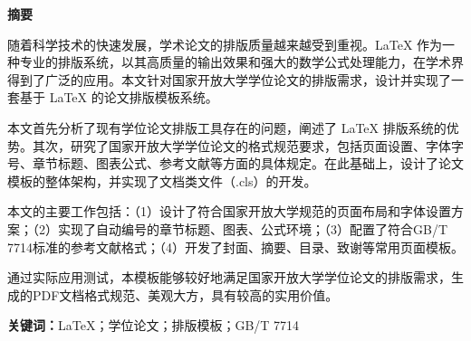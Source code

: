 
\begin{center}
    {\xiaosan{}\bfseries 摘\quad 要}
\end{center}

\vspace{0.5cm}

随着科学技术的快速发展，学术论文的排版质量越来越受到重视。LaTeX 作为一种专业的排版系统，以其高质量的输出效果和强大的数学公式处理能力，在学术界得到了广泛的应用。本文针对国家开放大学学位论文的排版需求，设计并实现了一套基于 LaTeX 的论文排版模板系统。

本文首先分析了现有学位论文排版工具存在的问题，阐述了 LaTeX 排版系统的优势。其次，研究了国家开放大学学位论文的格式规范要求，包括页面设置、字体字号、章节标题、图表公式、参考文献等方面的具体规定。在此基础上，设计了论文模板的整体架构，并实现了文档类文件（.cls）的开发。

本文的主要工作包括：（1）设计了符合国家开放大学规范的页面布局和字体设置方案；（2）实现了自动编号的章节标题、图表、公式环境；（3）配置了符合GB/T 7714标准的参考文献格式；（4）开发了封面、摘要、目录、致谢等常用页面模板。

通过实际应用测试，本模板能够较好地满足国家开放大学学位论文的排版需求，生成的PDF文档格式规范、美观大方，具有较高的实用价值。

\vspace{1cm}
\noindent\textbf{关键词：}LaTeX；学位论文；排版模板；GB/T 7714

\newpage
